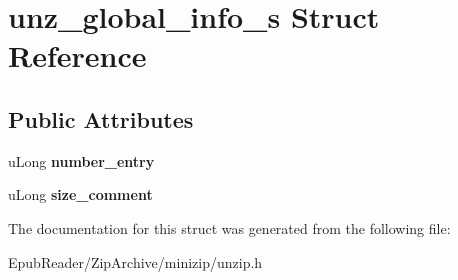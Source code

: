 \hypertarget{structunz__global__info__s}{\section{unz\-\_\-global\-\_\-info\-\_\-s Struct Reference}
\label{structunz__global__info__s}
}
\subsection*{Public Attributes}
\begin{DoxyCompactItemize}
\item 
\hypertarget{structunz__global__info__s_a827d1cd1d09f12acd6c2ee12494cb320}{u\-Long {\bfseries number\-\_\-entry}}\label{structunz__global__info__s_a827d1cd1d09f12acd6c2ee12494cb320}

\item 
\hypertarget{structunz__global__info__s_a10b58ab57b62301de813ecac0e974363}{u\-Long {\bfseries size\-\_\-comment}}\label{structunz__global__info__s_a10b58ab57b62301de813ecac0e974363}

\end{DoxyCompactItemize}


The documentation for this struct was generated from the following file\-:\begin{DoxyCompactItemize}
\item 
Epub\-Reader/\-Zip\-Archive/minizip/unzip.\-h\end{DoxyCompactItemize}
